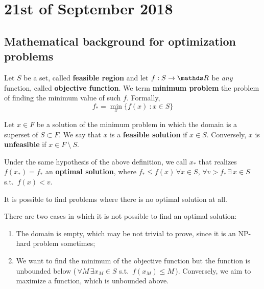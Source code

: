 \documentclass[computationalMathematics.tex]{subfiles}
\begin{document}
\chapter{21st of September 2018}

\section{Mathematical background for optimization problems}

\begin{definition}\label{def:min_prob}
  Let $S$ be a set, called \textbf{feasible region} and let $f : S \to \R$ be \emph{any} function, called \textbf{objective function}.
  We term \textbf{minimum problem} the problem of finding the minimum value of such $f$.
  Formally,
\begin{equation}
\tag{P}
f_* = \min\limits_x \{f(x)~:x \in S\}
\end{equation}
\end{definition}


\begin{definition}
  Let $x \in F$ be a solution of the minimum problem in which the domain is a superset of $S \subset F$. 
  We say that $x$ is a \textbf{feasible solution} if $x \in S$.
  Conversely, $x$ is \textbf{unfeasible} if $x \in F~\setminus~S$.
\end{definition}

\begin{definition}
  Under the same hypothesis of the above definition, we call $x_*$ that realizes $f(x_*) = f_*$ an \textbf{optimal solution}, where $f_* \leq f(x) \, \forall x \in S$, $\forall v > f_* \, \exists \, x \in S$ s.t.~$f(x) < v$.
\end{definition}

\noindent It is possible to find problems where there is no optimal solution at all.

\begin{obs}
  There are two cases in which it is not possible to find an optimal solution:
  \begin{enumerate}
    \item The domain is empty, which may be not trivial to prove, since it is an NP-hard problem sometimes;
    \item We want to find the minimum of the objective function but the function is unbounded below (\,$\forall M \, \exists x_M \in S$
      s.t.~$f(x_M) \leq M$\,).
      Conversely, we aim to maximize a function, which is unbounded above.
  \end{enumerate}
\end{obs}
\end{document}

